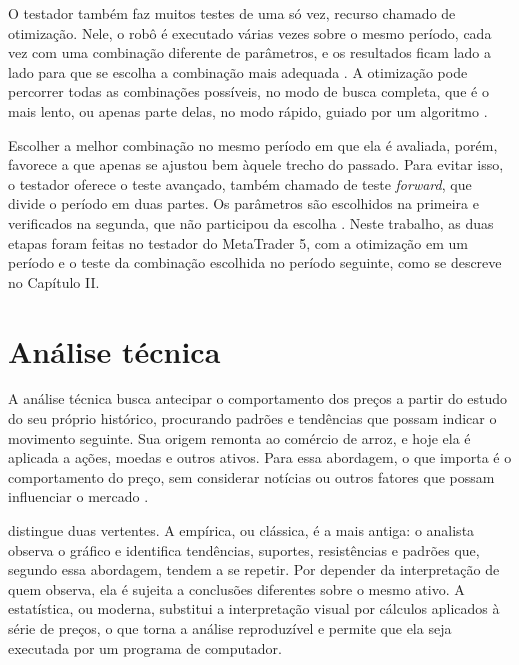 O testador também faz muitos testes de uma só vez, recurso chamado de otimização.
Nele, o robô é executado várias vezes sobre o mesmo período, cada vez com uma
combinação diferente de parâmetros, e os resultados ficam lado a lado para que se
escolha a combinação mais adequada \cite{metaquotesTeste}. A otimização pode
percorrer todas as combinações possíveis, no modo de busca completa, que é o mais
lento, ou apenas parte delas, no modo rápido, guiado por um algoritmo
\cite{metaquotesOtimizacao}.

Escolher a melhor combinação no mesmo período em que ela é avaliada, porém,
favorece a que apenas se ajustou bem àquele trecho do passado. Para evitar isso,
o testador oferece o teste avançado, também chamado de teste \textit{forward}, que
divide o período em duas partes. Os parâmetros são escolhidos na primeira e
verificados na segunda, que não participou da escolha \cite{metaquotesTeste}.
Neste trabalho, as duas etapas foram feitas no testador do MetaTrader 5, com a
otimização em um período e o teste da combinação escolhida no período seguinte,
como se descreve no Capítulo II.

\section{Análise técnica}

A análise técnica busca antecipar o comportamento dos preços a partir do estudo do
seu próprio histórico, procurando padrões e tendências que possam indicar o
movimento seguinte. Sua origem remonta ao comércio de arroz, e hoje ela é aplicada
a ações, moedas e outros ativos. Para essa abordagem, o que importa é o
comportamento do preço, sem considerar notícias ou outros fatores que possam
influenciar o mercado \cite{fernandes2014}.

 distingue duas vertentes. A empírica, ou clássica, é a
mais antiga: o analista observa o gráfico e identifica tendências, suportes,
resistências e padrões que, segundo essa abordagem, tendem a se repetir. Por
depender da interpretação de quem observa, ela é sujeita a conclusões diferentes
sobre o mesmo ativo. A estatística, ou moderna, substitui a interpretação visual
por cálculos aplicados à série de preços, o que torna a análise reproduzível e
permite que ela seja executada por um programa de computador.

